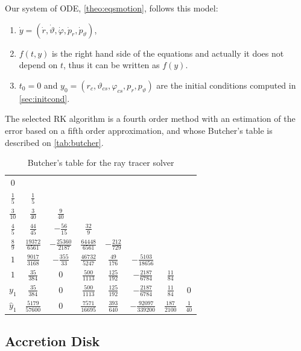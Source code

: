 Our system of \ac{ODE}, \autoref{theo:eqsmotion}, follows this model:
\begin{enumerate}
	\item $\dot{y} = (\dot{r}, \dot{\vartheta}, \dot{\varphi}, \dot{p}_r, \dot{p}_\vartheta)$,
	\item $f(t,y)$ is the right hand side of the equations and actually it does not depend on $t$, thus it can be written as $f(y)$.
	\item $t_0 = 0$ and $y_0 = (r_c, \vartheta_{cs}, \varphi_{cs}, p_{r}, p_{\vartheta})$ are the initial conditions computed in \autoref{sec:initcond}.
\end{enumerate}

The selected \ac{RK} algorithm is a fourth order method with an estimation of the error based on a fifth order approximation, and whose Butcher's table is described on \autoref{tab:butcher}.

\begin{table}[bth]
	\myfloatalign
	\begin{tabularx}{.9\textwidth}{c|ccccccc}
		$0$&  & & & & & & \\
		$\frac{1}{5}$&  $\frac{1}{5}$& & & & & & \\
		$\frac{3}{10}$&  $\frac{3}{40}$&  $\frac{9}{40}$& & & & & \\
		$\frac{4}{5}$&  $\frac{44}{45}$&  $-\frac{56}{15}$&  $\frac{32}{9}$& & & & \\
		$\frac{8}{9}$&  $\frac{19372}{6561}$&  $-\frac{25360}{2187}$&  $\frac{64448}{6561}$&  $-\frac{212}{729}$& & & \\
		$1$&  $\frac{9017}{3168}$&  $-\frac{355}{33}$&  $\frac{46732}{5247}$&  $\frac{49}{176}$&  $-\frac{5103}{18656}$& & \\
		$1$&  $\frac{35}{384}$&  $0$&  $\frac{500}{1113}$&  $\frac{125}{192}$&  $-\frac{2187}{6784}$&  $\frac{11}{84}$& \\ \hline
		$y_1$&  $\frac{35}{384}$&  $0$&  $\frac{500}{1113}$&  $\frac{125}{192}$&  $-\frac{2187}{6784}$&  $\frac{11}{84}$&  $0$ \\ \hline
		$\widehat{y}_1$&  $\frac{5179}{57600}$&  $0$&  $\frac{7571}{16695}$&  $\frac{393}{640}$&  $-\frac{92097}{339200}$&  $\frac{187}{2100}$&  $\frac{1}{40}$
	\end{tabularx}
	\caption{Butcher's table for the ray tracer solver}
	\label{tab:butcher}
\end{table}

\subsection{Accretion Disk}

